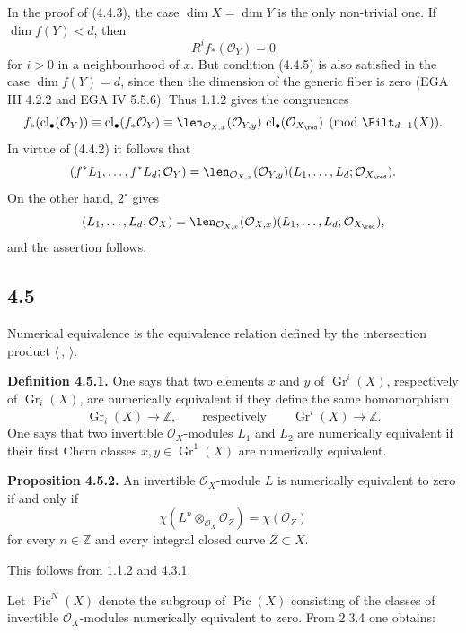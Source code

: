 \documentclass[11pt]{article}
\newcommand{\Gr}{\operatorname{Gr}}
\newcommand{\cl}{\operatorname{cl}}
\providecommand{\Pic}{\operatorname{Pic}}
\providecommand{\Gr}{\operatorname{Gr}}
\providecommand{\Gr}{\operatorname{G}}
\begin{document}
In the proof of (4.4.3), the case \(\dim X=\dim Y\) is the only non-trivial one. If \(\dim f(Y)<d\), then
\begin{equation}\tag{4.4.5}
 R^if_*(\mathcal O_Y)=0
\end{equation}
for \(i>0\) in a neighbourhood of \(x\). But condition (4.4.5) is also satisfied in the case \(\dim f(Y)=d\), since then the dimension of the generic fiber is zero (EGA III 4.2.2 and EGA IV 5.5.6). Thus 1.1.2 gives the congruences
\[
 f_*(\cl_\bullet(\mathcal O_Y))
 \equiv
 \cl_\bullet(f_*\mathcal O_Y)
 \equiv
 \len_{\mathcal O_{X,x}}(\mathcal O_{Y,y})\,
 \cl_\bullet(\mathcal O_{X_{\red}})
 \pmod{\Filt_{d-1}(X)}.
\]
In virtue of (4.4.2) it follows that
\[
 (f^*L_1,\ldots,f^*L_d;\mathcal O_Y)
 =
 \len_{\mathcal O_{X,x}}(\mathcal O_{Y,y})
 (L_1,\ldots,L_d;\mathcal O_{X_{\red}}).
\]
On the other hand, \(2^\circ\) gives
\[
 (L_1,\ldots,L_d;\mathcal O_X)
 =
 \len_{\mathcal O_{X,x}}(\mathcal O_{X,x})
 (L_1,\ldots,L_d;\mathcal O_{X_{\red}}),
\]
and the assertion follows.

\subsection*{4.5}
Numerical equivalence is the equivalence relation defined by the intersection product \(\langle\, ,\,\rangle\).

\textbf{Definition 4.5.1.} One says that two elements \(x\) and \(y\) of \(\Gr^i(X)\), respectively of \(\Gr_i(X)\), are numerically equivalent if they define the same homomorphism
\[
 \Gr_i(X)\longrightarrow \mathbb Z,
 \qquad\text{respectively}\qquad
 \Gr^i(X)\longrightarrow \mathbb Z.
\]
One says that two invertible \(\mathcal O_X\)-modules \(L_1\) and \(L_2\) are numerically equivalent if their first Chern classes \(x,y\in\Gr^1(X)\) are numerically equivalent.

\textbf{Proposition 4.5.2.} An invertible \(\mathcal O_X\)-module \(L\) is numerically equivalent to zero if and only if
\begin{equation}\tag{4.5.3}
 \chi(L^n\otimes_{\mathcal O_X}\mathcal O_Z)=\chi(\mathcal O_Z)
\end{equation}
for every \(n\in\mathbb Z\) and every integral closed curve \(Z\subset X\).

This follows from 1.1.2 and 4.3.1.

Let \(\Pic^N(X)\) denote the subgroup of \(\Pic(X)\) consisting of the classes of invertible \(\mathcal O_X\)-modules numerically equivalent to zero. From 2.3.4 one obtains:
\end{document}
